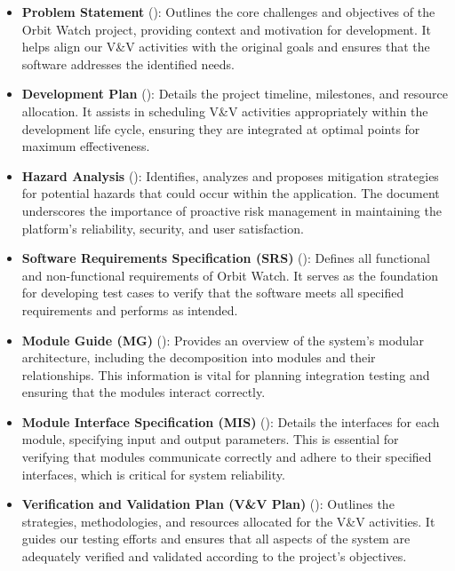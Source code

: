 \documentclass[12pt, titlepage]{article}
\begin{document}
\begin{itemize}
    \item \textbf{Problem Statement} (\cite{Problem_Statement}): Outlines the core challenges and objectives of the Orbit Watch project, providing context and motivation for development. It helps align our V\&V activities with the original goals and ensures that the software addresses the identified needs.

    \item \textbf{Development Plan} (\cite{Development_Plan}): Details the project timeline, milestones, and resource allocation. It assists in scheduling V\&V activities appropriately within the development life cycle, ensuring they are integrated at optimal points for maximum effectiveness.
    
    \item \textbf{Hazard Analysis} (\cite{Hazard_Analysis}): Identifies, analyzes and proposes mitigation strategies for potential hazards that could occur within the application. The document underscores the importance of proactive risk management in maintaining the platform's reliability, security, and user satisfaction.

    \item \textbf{Software Requirements Specification (SRS)} (\cite{SRS}): Defines all functional and non-functional requirements of Orbit Watch. It serves as the foundation for developing test cases to verify that the software meets all specified requirements and performs as intended.

    \item \textbf{Module Guide (MG)} (\cite{MG}): Provides an overview of the system's modular architecture, including the decomposition into modules and their relationships. This information is vital for planning integration testing and ensuring that the modules interact correctly.

    \item \textbf{Module Interface Specification (MIS)} (\cite{MIS}): Details the interfaces for each module, specifying input and output parameters. This is essential for verifying that modules communicate correctly and adhere to their specified interfaces, which is critical for system reliability.

    \item \textbf{Verification and Validation Plan (V\&V Plan)} (\cite{VnV}): Outlines the strategies, methodologies, and resources allocated for the V\&V activities. It guides our testing efforts and ensures that all aspects of the system are adequately verified and validated according to the project's objectives.
\end{itemize}
\end{document}
